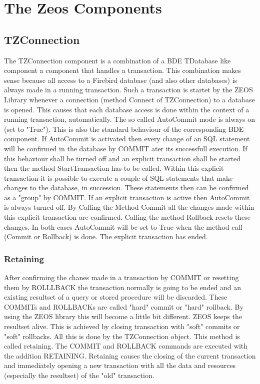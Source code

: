 \documentclass[a4paper,12pt,oneside]{book}
\begin{document}
\chapter{The Zeos Components}

\section{TZConnection}
The TZConnection component is a combination of a BDE TDatabase like component a component that
handles a transaction.
This combination makes sense because all access to a Firebird database (and also other databases) is always made in a running transaction.
Such a transaction is startet by the ZEOS Library whenever a connection (method Connect of TZConnection) to a database is opened.
This causes that each database access is done within the context of a running transaction, automatically.
The so called AutoCommit mode is always on (set to "True").
This is also the standard behaviour of the corresponding BDE component.
If AutoCommit is activated then every change of an SQL statement will be confirmed in the
database by COMMIT ater its successfull execution.
If this behaviour shall be turned off and an explicit transaction shall be started then the method StartTransaction has to be called.
Within this explicit transaction it is possible to execute a couple of SQL statements that make changes to the database, in succession.
These statements then can be confirmed as a "group" by COMMIT.
If an explicit transaction is active then AutoCommit is always turned off.
By Calling the Method Commit all the changes made within this explicit transaction are confirmed.
Calling the method Rollback resets these changes.
In both cases AutoCommit will be set to True when the method call (Commit or Rollback) is done.
The explicit transaction has ended.

\subsection{Retaining}
After confirming the chanes made in a transaction by COMMIT or resetting them by ROLLLBACK the
transaction normally is going to be ended and an existing resultset of a query or stored procedure will be discarded.
These COMMITs and ROLLBACKs are called "hard" commit or "hard" rollback.
By using the ZEOS library this will become a little bit different.
ZEOS keeps the resultset alive.
This is achieved by closing transaction with "soft" commits or "soft" rollbacks.
All this is done by the TZConnection object.
This method is called retaining.
The COMMIT and ROLLBACK commands are executed with the addition RETAINING.
Retaining causes the closing of the current transaction and immediately opening a new transaction with all the data and resources (especially the resultset) of the "old" transaction.
\end{document}
